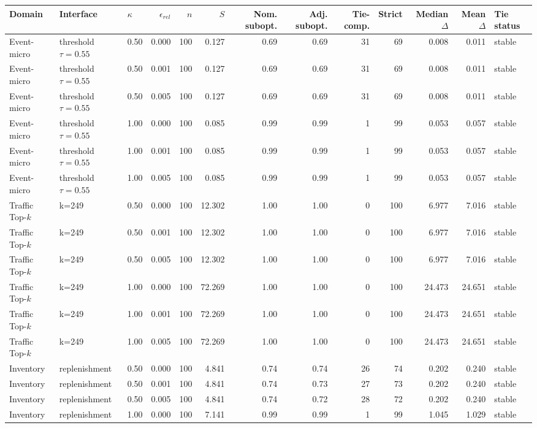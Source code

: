 \begin{tabular}{lllrrrrrrrrrl}
\toprule
Domain & Interface & $\kappa$ & $\epsilon_{rel}$ & $n$ & $S$ & Nom. subopt. & Adj. subopt. & Tie-comp. & Strict & Median $\Delta$ & Mean $\Delta$ & Tie status \\
\midrule
Event-micro & threshold $\tau=0.55$ & 0.50 & 0.000 & 100 & 0.127 & 0.69 & 0.69 & 31 & 69 & 0.008 & 0.011 & stable \\
Event-micro & threshold $\tau=0.55$ & 0.50 & 0.001 & 100 & 0.127 & 0.69 & 0.69 & 31 & 69 & 0.008 & 0.011 & stable \\
Event-micro & threshold $\tau=0.55$ & 0.50 & 0.005 & 100 & 0.127 & 0.69 & 0.69 & 31 & 69 & 0.008 & 0.011 & stable \\
Event-micro & threshold $\tau=0.55$ & 1.00 & 0.000 & 100 & 0.085 & 0.99 & 0.99 & 1 & 99 & 0.053 & 0.057 & stable \\
Event-micro & threshold $\tau=0.55$ & 1.00 & 0.001 & 100 & 0.085 & 0.99 & 0.99 & 1 & 99 & 0.053 & 0.057 & stable \\
Event-micro & threshold $\tau=0.55$ & 1.00 & 0.005 & 100 & 0.085 & 0.99 & 0.99 & 1 & 99 & 0.053 & 0.057 & stable \\
Traffic Top-\(k\) & k=249 & 0.50 & 0.000 & 100 & 12.302 & 1.00 & 1.00 & 0 & 100 & 6.977 & 7.016 & stable \\
Traffic Top-\(k\) & k=249 & 0.50 & 0.001 & 100 & 12.302 & 1.00 & 1.00 & 0 & 100 & 6.977 & 7.016 & stable \\
Traffic Top-\(k\) & k=249 & 0.50 & 0.005 & 100 & 12.302 & 1.00 & 1.00 & 0 & 100 & 6.977 & 7.016 & stable \\
Traffic Top-\(k\) & k=249 & 1.00 & 0.000 & 100 & 72.269 & 1.00 & 1.00 & 0 & 100 & 24.473 & 24.651 & stable \\
Traffic Top-\(k\) & k=249 & 1.00 & 0.001 & 100 & 72.269 & 1.00 & 1.00 & 0 & 100 & 24.473 & 24.651 & stable \\
Traffic Top-\(k\) & k=249 & 1.00 & 0.005 & 100 & 72.269 & 1.00 & 1.00 & 0 & 100 & 24.473 & 24.651 & stable \\
Inventory & replenishment & 0.50 & 0.000 & 100 & 4.841 & 0.74 & 0.74 & 26 & 74 & 0.202 & 0.240 & stable \\
Inventory & replenishment & 0.50 & 0.001 & 100 & 4.841 & 0.74 & 0.73 & 27 & 73 & 0.202 & 0.240 & stable \\
Inventory & replenishment & 0.50 & 0.005 & 100 & 4.841 & 0.74 & 0.72 & 28 & 72 & 0.202 & 0.240 & stable \\
Inventory & replenishment & 1.00 & 0.000 & 100 & 7.141 & 0.99 & 0.99 & 1 & 99 & 1.045 & 1.029 & stable \\

\end{tabular}
